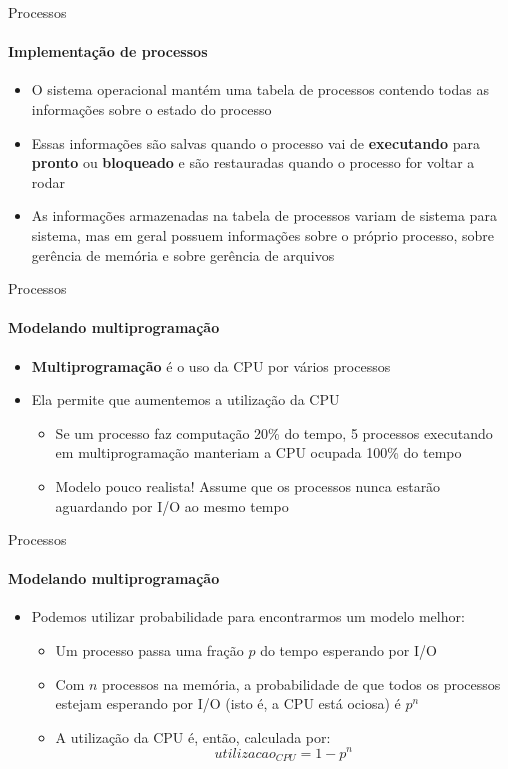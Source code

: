 \documentclass{beamer}
\begin{document}
\begin{frame}{Processos}
	\framesubtitle{Implementação de processos}
	\begin{itemize}
		\item O sistema operacional mantém uma \alert{tabela de processos} contendo todas as informações sobre o estado do processo
		\item Essas informações são salvas quando o processo vai de \textbf{executando} para \textbf{pronto} ou \textbf{bloqueado} e são restauradas quando o processo for voltar a rodar
		\item As informações armazenadas na tabela de processos variam de sistema para sistema, mas em geral possuem informações sobre o próprio processo, sobre gerência de memória e sobre gerência de arquivos
	\end{itemize}
\end{frame}
\begin{frame}{Processos}
	\framesubtitle{Modelando multiprogramação}
	\begin{itemize}
		\item \textbf{Multiprogramação} é o uso da CPU por vários processos
		\item Ela permite que aumentemos a utilização da CPU
		\begin{itemize}
			\item Se um processo faz computação 20\% do tempo, 5 processos executando em multiprogramação manteriam a CPU ocupada 100\% do tempo
			\item Modelo pouco realista! Assume que os processos nunca estarão aguardando por I/O ao mesmo tempo
		\end{itemize}
	\end{itemize}
\end{frame}
\begin{frame}{Processos}
	\framesubtitle{Modelando multiprogramação}
	\begin{itemize}
		\item Podemos utilizar probabilidade para encontrarmos um modelo melhor:
		\begin{itemize}
			\item Um processo passa uma fração $p$ do tempo esperando por I/O
			\item Com $n$ processos na memória, a probabilidade de que todos os processos estejam esperando por I/O (isto é, a CPU está ociosa) é $p^{n}$
			\item A utilização da CPU é, então, calculada por:
			\begin{equation*}
			utilizacao_{CPU} = 1 - p^{n}
			\end{equation*}
		\end{itemize}
	\end{itemize}
\end{frame}
\end{document}
